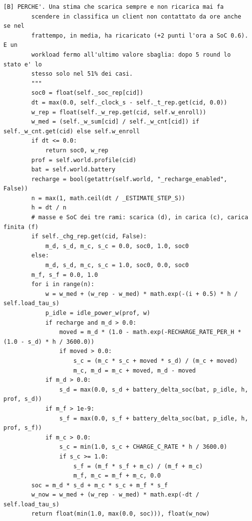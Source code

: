 \documentclass[11pt,a4paper]{article}
\begin{document}
\begin{lstlisting}[style=py,firstnumber=383,caption={\texttt{tesifl/strategies/sage\_smart.py}, lines 383--464}]
        [B] PERCHE'. Una stima che scarica sempre e non ricarica mai fa
        scendere in classifica un client non contattato da ore anche se nel
        frattempo, in media, ha ricaricato (+2 punti l'ora a SoC 0.6). E un
        workload fermo all'ultimo valore sbaglia: dopo 5 round lo stato e' lo
        stesso solo nel 51% dei casi.
        """
        soc0 = float(self._soc_rep[cid])
        dt = max(0.0, self._clock_s - self._t_rep.get(cid, 0.0))
        w_rep = float(self._w_rep.get(cid, self.w_enroll))
        w_med = (self._w_sum[cid] / self._w_cnt[cid]) if self._w_cnt.get(cid) else self.w_enroll
        if dt <= 0.0:
            return soc0, w_rep
        prof = self.world.profile(cid)
        bat = self.world.battery
        recharge = bool(getattr(self.world, "_recharge_enabled", False))
        n = max(1, math.ceil(dt / _ESTIMATE_STEP_S))
        h = dt / n
        # masse e SoC dei tre rami: scarica (d), in carica (c), carica finita (f)
        if self._chg_rep.get(cid, False):
            m_d, s_d, m_c, s_c = 0.0, soc0, 1.0, soc0
        else:
            m_d, s_d, m_c, s_c = 1.0, soc0, 0.0, soc0
        m_f, s_f = 0.0, 1.0
        for i in range(n):
            w = w_med + (w_rep - w_med) * math.exp(-(i + 0.5) * h / self.load_tau_s)
            p_idle = idle_power_w(prof, w)
            if recharge and m_d > 0.0:
                moved = m_d * (1.0 - math.exp(-RECHARGE_RATE_PER_H * (1.0 - s_d) * h / 3600.0))
                if moved > 0.0:
                    s_c = (m_c * s_c + moved * s_d) / (m_c + moved)
                    m_c, m_d = m_c + moved, m_d - moved
            if m_d > 0.0:
                s_d = max(0.0, s_d + battery_delta_soc(bat, p_idle, h, prof, s_d))
            if m_f > 1e-9:
                s_f = max(0.0, s_f + battery_delta_soc(bat, p_idle, h, prof, s_f))
            if m_c > 0.0:
                s_c = min(1.0, s_c + CHARGE_C_RATE * h / 3600.0)
                if s_c >= 1.0:
                    s_f = (m_f * s_f + m_c) / (m_f + m_c)
                    m_f, m_c = m_f + m_c, 0.0
        soc = m_d * s_d + m_c * s_c + m_f * s_f
        w_now = w_med + (w_rep - w_med) * math.exp(-dt / self.load_tau_s)
        return float(min(1.0, max(0.0, soc))), float(w_now)


\end{lstlisting}
\end{document}
